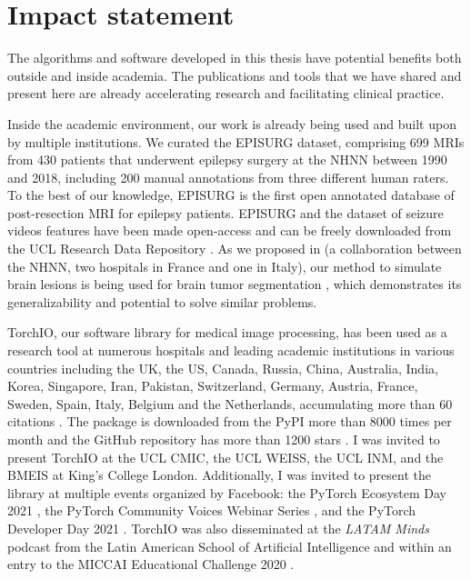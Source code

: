 \chapter{Impact statement}

The algorithms and software developed in this thesis have potential benefits both outside and inside academia.
The publications and tools that we have shared and present here are already accelerating research and facilitating clinical practice.

Inside the academic environment, our work is already being used and built upon by multiple institutions.
We curated the EPISURG dataset, comprising 699 \acp{MRI} from 430 patients that underwent epilepsy surgery at the \ac{NHNN} between 1990 and 2018, including 200 manual annotations from three different human raters.
To the best of our knowledge, EPISURG is the first open annotated database of post-resection \ac{MRI} for epilepsy patients.
EPISURG and the dataset of seizure videos features have been made open-access and can be freely downloaded from the UCL Research Data Repository \cite{perez-garcia_episurg_2020,perez-garcia_data_2021}.
As we proposed in \cite{perez-garcia_self-supervised_2021} (a collaboration between the \ac{NHNN}, two hospitals in France and one in Italy), our method to simulate brain lesions is being used for brain tumor segmentation \cite{zhang_self-supervised_2021}, which demonstrates its generalizability and potential to solve similar problems.

TorchIO, our software library for medical image processing, has been used as a research tool at numerous hospitals and leading academic institutions in various countries including the UK, the US, Canada, Russia, China, Australia, India, Korea, Singapore, Iran, Pakistan, Switzerland, Germany, Austria, France, Sweden, Spain, Italy, Belgium and the Netherlands, accumulating more than 60 citations%
.
The package is downloaded from the \ac{PyPI} more than 8000 times per month%
 and the GitHub repository has more than 1200 stars%
.
I was invited to present TorchIO at
the UCL \ac{CMIC},
the UCL \ac{WEISS},
the UCL \ac{INM}, and
the \ac{BMEIS} at King's College London.
Additionally, I was invited to present the library at multiple events organized by Facebook: the PyTorch Ecosystem Day 2021%
,
the PyTorch Community Voices Webinar Series%
,
and the PyTorch Developer Day 2021%
.
TorchIO was also disseminated at the \textit{LATAM Minds} podcast from the Latin American School of Artificial Intelligence%
and within an entry to the MICCAI Educational Challenge 2020%
.

